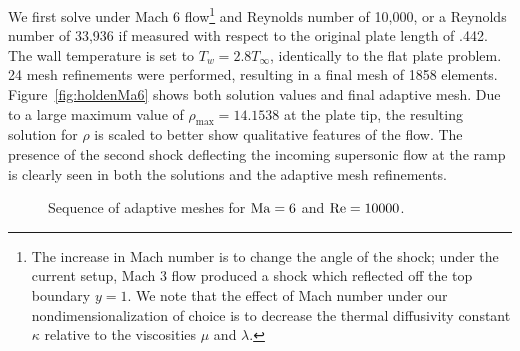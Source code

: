 We first solve under Mach 6 flow\footnote{The increase in Mach number is to change the angle of the shock; under the current setup, Mach 3 flow produced a shock which reflected off the top boundary $y = 1$.  We note that the effect of Mach number under our nondimensionalization of choice is to decrease the thermal diffusivity constant $\kappa$ relative to the viscosities $\mu$ and $\lambda$.} and Reynolds number of 10,000, or a Reynolds number of 33,936 if measured with respect to the original plate length of .442.  The wall temperature is set to $T_{w} = 2.8T_{\infty}$, identically to the flat plate problem.  24 mesh refinements were performed, resulting in a final mesh of 1858 elements.  Figure~\ref{fig:holdenMa6} shows both solution values and final adaptive mesh.  Due to a large maximum value of $\rho_{\max} = 14.1538$ at the plate tip, the resulting solution for $\rho$ is scaled to better show qualitative features of the flow.  The presence of the second shock deflecting the incoming supersonic flow at the ramp is clearly seen in both the solutions and the adaptive mesh refinements.  

\begin{figure}
\centering
{}
\caption{Sequence of adaptive meshes for ${\rm Ma} = 6$ and $\Reyn = 10000$.}
\label{fig:holdenMa6Meshes}
\end{figure}

